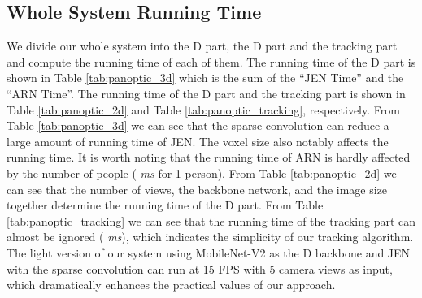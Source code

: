 \subsection{Whole System Running Time }
We divide our whole system into the D part, the D part and the tracking part and compute the running time of each of them. The running time of the D part is shown in Table \ref{tab:panoptic_3d} which is the sum of the ``JEN Time'' and the ``ARN Time''. The running time of the D part and the tracking part is shown in Table \ref{tab:panoptic_2d} and Table \ref{tab:panoptic_tracking}, respectively. From Table \ref{tab:panoptic_3d} we can see that the sparse convolution can reduce a large amount of running time of JEN. The voxel size also notably affects the running time. It is worth noting that the running time of ARN is hardly affected by the number of people ( \emph{ms} for 1 person). From Table \ref{tab:panoptic_2d} we can see that the number of views, the backbone network, and the image size together determine the running time of the D part. From Table \ref{tab:panoptic_tracking} we can see that the running time of the tracking part can almost be ignored ( \emph{ms}), which indicates the simplicity of our tracking algorithm. The light version of our system using MobileNet-V2 \cite{sandler2018mobilenetv2} as the D backbone and  JEN with the sparse convolution can run at 15 FPS with 5 camera views as input, which dramatically enhances the practical values of our approach. 






